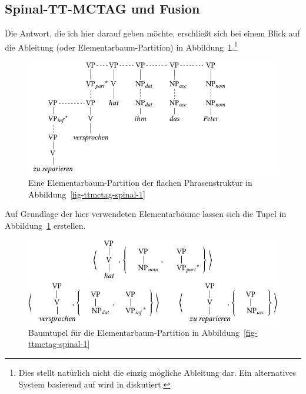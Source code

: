 \subsection{Spinal-TT-MCTAG und Fusion} 

Die Antwort, die ich hier darauf geben möchte, erschlie\ss t sich bei einem Blick auf die Ableitung (oder Elementarbaum-Partition) in Abbildung~\ref{fig-ttmctag-spinal-3}.\footnote{Dies stellt natürlich nicht die einzig mögliche Ableitung dar. Ein alternatives System basierend auf  wird in \cite{Lichte:10} diskutiert.} 
\begin{figure}[t]
\centering
\includegraphics{graphics/abb746.pdf}
\caption{\label{fig-ttmctag-spinal-3}Eine Elementarbaum-Partition der flachen Phrasenstruktur in Abbildung~\ref{fig-ttmctag-spinal-1}}
\end{figure}
Auf Grundlage der hier verwendeten Elementarbäume lassen sich die Tupel in Abbildung~\ref{fig-ttmctag-spinal-3} erstellen.  
\begin{figure}[t]
\centering
\includegraphics{graphics/abb747.pdf}
\caption{\label{fig-ttmctag-spinal-4}Baumtupel für die Elementarbaum-Partition in Abbildung~\ref{fig-ttmctag-spinal-1}}
\end{figure}
